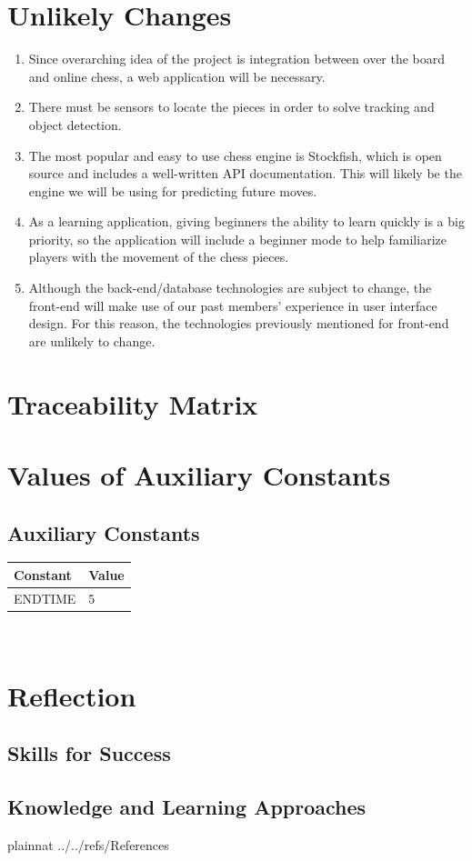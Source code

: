 \documentclass[12pt]{article}
\begin{document}
  \section{Unlikely Changes}    
  
  \noindent
  \begin{enumerate}[{UC}1., leftmargin=2\parindent]

  \item Since overarching idea of the project is integration between
  over the board and online chess, a web application will be necessary.
  \item There must be sensors to locate the pieces in order to solve tracking and object detection.
  \item The most popular and easy to use chess engine is Stockfish, which is 
  open source and includes a well-written API documentation. This will likely be the engine we will be using for predicting future moves.
  \item As a learning application, giving beginners the ability to learn quickly
  is a big priority, so the application will include a beginner mode to help familiarize players with the movement of the chess pieces.
  \item Although the back-end/database technologies are subject to change,
  the front-end will make use of our past members' experience in user interface design. For this reason, the technologies
  previously mentioned for front-end are unlikely to change.
  
  \end{enumerate}

\section{Traceability Matrix}

\appendix
\section{Values of Auxiliary Constants}
\subsection{Auxiliary Constants}
\begin{tabular}{l l} 
  \toprule		
  \textbf{Constant} & \textbf{Value}\\
  \midrule 
  ENDTIME & 5\\
  \bottomrule
\end{tabular}\\

\newpage

\appendix
\section{Reflection}
\subsection{Skills for Success}
\subsection{Knowledge and Learning Approaches}

\newpage

 {plainnat}
 {../../refs/References}
\end{document}
